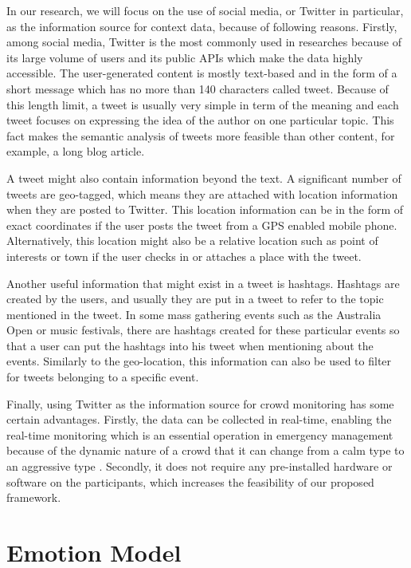 In our research, we will focus on the use of social media, or Twitter in particular, as the information source for context data, because of following reasons. Firstly, among social media, Twitter is the most commonly used in researches because of its large volume of users and its public APIs which make the data highly accessible. The user-generated content is mostly text-based and in the form of a short message which has no more than 140 characters called tweet. Because of this length limit, a tweet is usually very simple in term of the meaning and each tweet focuses on expressing the idea of the author on one particular topic. This fact makes the semantic analysis of tweets more feasible than other content, for example, a long blog article.

A tweet might also contain information beyond the text. A significant number of tweets are geo-tagged, which means they are attached with location information when they are posted to Twitter. This location information can be in the form of exact coordinates if the user posts the tweet from a GPS enabled mobile phone. Alternatively, this location might also be a relative location such as point of interests or town if the user checks in or attaches a place with the tweet.

Another useful information that might exist in a tweet is hashtags. Hashtags are created by the users, and usually they are put in a tweet to refer to the topic mentioned in the tweet. In some mass gathering events such as the Australia Open or music festivals, there are hashtags created for these particular events so that a user can put the hashtags into his tweet when mentioning about the events. Similarly to the geo-location, this information can also be used to filter for tweets belonging to a specific event.

Finally, using Twitter as the information source for crowd monitoring has some certain advantages. Firstly, the data can be collected in real-time, enabling the real-time monitoring which is an essential operation in emergency management because of the dynamic nature of a crowd that it can change from a calm type to an aggressive type \citep{Berlonghi1995}. Secondly, it does not require any pre-installed hardware or software on the participants, which increases the feasibility of our proposed framework.

\section{Emotion Model}

